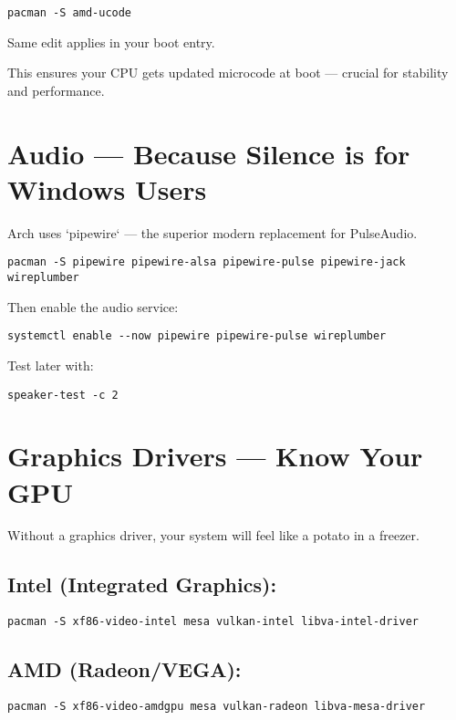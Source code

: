 \documentclass[12pt]{book}
\begin{document}
\begin{lstlisting}
pacman -S amd-ucode
\end{lstlisting}

Same edit applies in your boot entry.

This ensures your CPU gets updated microcode at boot — crucial for stability and performance.

\section{Audio — Because Silence is for Windows Users}

Arch uses `pipewire` — the superior modern replacement for PulseAudio.

\begin{lstlisting}
pacman -S pipewire pipewire-alsa pipewire-pulse pipewire-jack wireplumber
\end{lstlisting}

Then enable the audio service:

\begin{lstlisting}
systemctl enable --now pipewire pipewire-pulse wireplumber
\end{lstlisting}

Test later with:

\begin{lstlisting}
speaker-test -c 2
\end{lstlisting}

\section{Graphics Drivers — Know Your GPU}

Without a graphics driver, your system will feel like a potato in a freezer.

\subsection*{Intel (Integrated Graphics):}

\begin{lstlisting}
pacman -S xf86-video-intel mesa vulkan-intel libva-intel-driver
\end{lstlisting}

\subsection*{AMD (Radeon/VEGA):}

\begin{lstlisting}
pacman -S xf86-video-amdgpu mesa vulkan-radeon libva-mesa-driver
\end{lstlisting}
\end{document}
